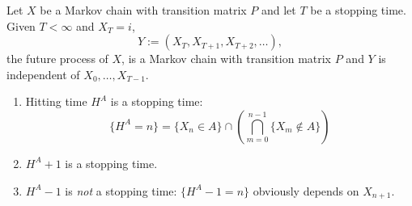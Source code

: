 \documentclass[a4paper]{article}
\begin{document}
\begin{theorem}
  Let \(X\) be a Markov chain with transition matrix \(P\) and let \(T\) be a stopping time. Given \(T < \infty\) and \(X_T = i\),
  \[
    Y := (X_T, X_{T + 1}, X_{T + 2}, \dots),
  \]
  the future process of \(X\), is a Markov chain with transition matrix \(P\) and \(Y\) is independent of \(X_0, \dots, X_{T - 1}\).
\end{theorem}

\begin{eg}\leavevmode
  \begin{enumerate}
  \item Hitting time \(H^A\) is a stopping time:
    \[
      \{H^A = n\} = \{X_n \in A\} \cap \left( \bigcap_{m = 0}^{n - 1} \{X_m \notin A \} \right)
    \]
  \item \(H^A + 1\) is a stopping time.
  \item \(H^A - 1\) is \emph{not} a stopping time: \(\{H^A - 1 = n\}\) obviously depends on \(X_{n + 1}\).
  \end{enumerate}
\end{eg}
\end{document}
